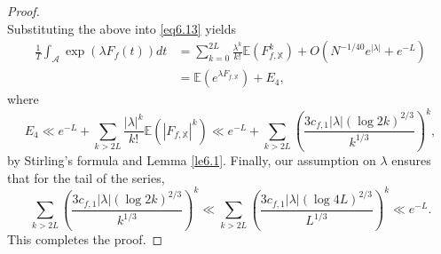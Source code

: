 \documentclass[10pt,a4paper]{amsart}
\begin{document}
\begin{proof}
\[\]
Substituting the above into \eqref{eq6.13} yields
\[
\begin{aligned}
\frac{1}{T} \int_{\mathcal{A}} \exp (\lambda F_f(t)) d t & =\sum_{k=0}^{2 L} \frac{\lambda^k}{k!} \mathbb{E}\left(F_{f,\mathbb{X}}^k\right)+O\left(N^{-1 / 40} e^{|\lambda|}+e^{-L}\right) \\
& =\mathbb{E}\left(e^{\lambda F_{f,\mathbb{X}}}\right)+E_4,
\end{aligned}
\]
where
\[
E_4 \ll e^{-L}+\sum_{k>2 L} \frac{|\lambda|^k}{k!} \mathbb{E}\left(\left|F_{f,\mathbb{X}}\right|^k\right) \ll e^{-L}+\sum_{k>2 L}\left(\frac{3 c_{f,1}|\lambda|\left(\log 2k\right)^{2/3}}{k^{1 /3}}\right)^k,
\]
by Stirling's formula and Lemma \ref{le6.1}. Finally, our assumption on $\lambda$ ensures that for the tail of the series,
\[
\sum_{k > 2L} \left( \frac{3 c_{f,1} |\lambda|\left(\log 2k\right)^{2/3}}{k^{1 /3}} \right)^k
\ll \sum_{k > 2L} \left( \frac{3 c_{f,1} |\lambda|\left(\log 4L\right)^{2/3}}{L^{1 /3}} \right)^k
\ll e^{-L}.
\]
 This completes the proof.
\end{proof}
\end{document}
